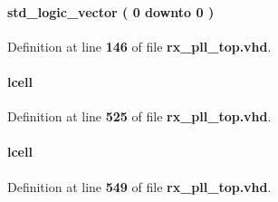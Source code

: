 \paragraph[{inst5\+\_\+dataout}]{ {\bfseries \textcolor{comment}{std\+\_\+logic\+\_\+vector}\textcolor{vhdlchar}{ }\textcolor{vhdlchar}{(}\textcolor{vhdlchar}{ }\textcolor{vhdlchar}{ } \textcolor{vhdldigit}{0} \textcolor{vhdlchar}{ }\textcolor{keywordflow}{downto}\textcolor{vhdlchar}{ }\textcolor{vhdlchar}{ } \textcolor{vhdldigit}{0} \textcolor{vhdlchar}{ }\textcolor{vhdlchar}{)}\textcolor{vhdlchar}{ }} \hspace{0.3cm}{\ttfamily [Signal]}}\label{classrx__pll__top_1_1arch_a9e0494c1f938d777cb9a5e2c4c83b9b1}


Definition at line {\bf 146} of file {\bf rx\+\_\+pll\+\_\+top.\+vhd}.

\paragraph[{lcell0}]{ {\bfseries \textcolor{vhdlchar}{lcell}\textcolor{vhdlchar}{ }} \hspace{0.3cm}{\ttfamily [Instantiation]}}\label{classrx__pll__top_1_1arch_a8edbd2f53cc1b21b1cc1cfea81ac5721}


Definition at line {\bf 525} of file {\bf rx\+\_\+pll\+\_\+top.\+vhd}.

\paragraph[{lcell0}]{ {\bfseries \textcolor{vhdlchar}{lcell}\textcolor{vhdlchar}{ }} \hspace{0.3cm}{\ttfamily [Instantiation]}}\label{classrx__pll__top_1_1arch_a8edbd2f53cc1b21b1cc1cfea81ac5721}


Definition at line {\bf 549} of file {\bf rx\+\_\+pll\+\_\+top.\+vhd}.

